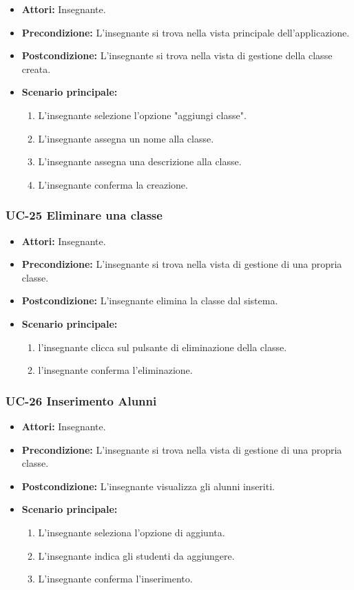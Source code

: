 \begin{itemize}
	\item \textbf{Attori:} Insegnante.
	\item \textbf{Precondizione:} L'insegnante si trova nella vista principale dell'applicazione.
	\item \textbf{Postcondizione:} L'insegnante si trova nella vista di gestione della classe creata.
	\item \textbf{Scenario principale:}
	\begin{enumerate}
		\item L'insegnante selezione l'opzione "aggiungi classe".
		\item L'insegnante assegna un nome alla classe.
		\item L'insegnante assegna una descrizione alla classe.
		\item L'insegnante conferma la creazione.
	\end{enumerate}
\end{itemize}

\subsubsection{UC-25 Eliminare una classe}
\begin{itemize}
	\item \textbf{Attori:} Insegnante.
	\item \textbf{Precondizione:} L'insegnante si trova nella vista di gestione di una propria classe.
	\item \textbf{Postcondizione:} L'insegnante elimina la classe dal sistema.
	\item \textbf{Scenario principale:}
	\begin{enumerate}
		\item l'insegnante clicca sul pulsante di eliminazione della classe.
		\item l'insegnante conferma l'eliminazione.
	\end{enumerate}
\end{itemize}

\subsubsection{UC-26 Inserimento Alunni}
\begin{itemize}
	\item \textbf{Attori:} Insegnante.
	\item \textbf{Precondizione:} L'insegnante si trova nella vista di gestione di una propria classe.
	\item \textbf{Postcondizione:} L'insegnante visualizza gli alunni inseriti.
	\item \textbf{Scenario principale:}
	\begin{enumerate}
		\item L'insegnante seleziona l'opzione di aggiunta.
		\item L'insegnante indica gli studenti da aggiungere.
		\item L'insegnante conferma l'inserimento.
	\end{enumerate}
\end{itemize}


